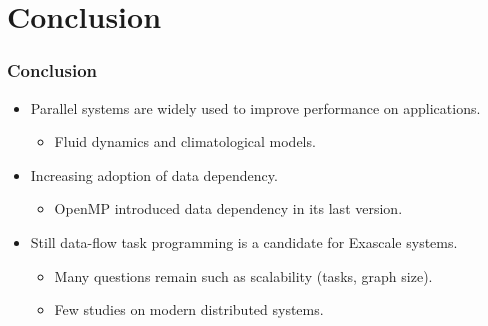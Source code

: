 
\section{Conclusion}

\begin{frame}
  \frametitle{Conclusion}
  \begin{itemize}
  \item Parallel systems are widely used to improve performance on applications. 
    \begin{itemize}
    \item Fluid dynamics and climatological models.
    \end{itemize}
  \pause
  \item Increasing adoption of data dependency.
    \begin{itemize}
    \item OpenMP introduced data dependency in its last version.
    \end{itemize}
  \pause
  \item Still data-flow task programming is a candidate for Exascale systems.
    \begin{itemize}
    \item Many questions remain such as scalability (tasks, graph size).
    \item Few studies on modern distributed systems.
    \end{itemize}
  \end{itemize}
\end{frame}

